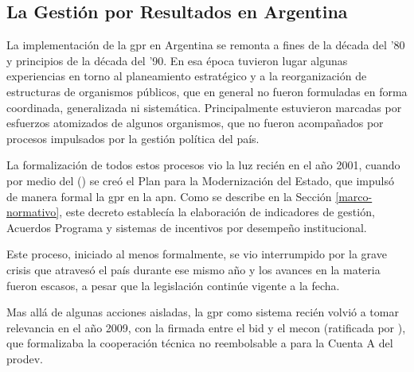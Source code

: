 \subsection{La Gestión por Resultados en Argentina}

La implementación de la \ac{gpr} en Argentina se remonta a fines de la década del '80 y principios de la década del '90. En esa época tuvieron lugar algunas experiencias en torno al planeamiento estratégico y a la reorganización de estructuras de organismos públicos, que en general no fueron formuladas en forma coordinada, generalizada ni sistemática. Principalmente estuvieron marcadas por esfuerzos atomizados de algunos organismos, que no fueron acompañados por procesos impulsados por la gestión política del país.

La formalización de todos estos procesos vio la luz recién en el año 2001, cuando por medio del \citeauthor{decreto103} (\citeyear{decreto103}) se creó el Plan para la Modernización del Estado, que impulsó de manera formal la \ac{gpr} en la \ac{apn}.
Como se describe en la Sección \ref{marco-normativo}, este decreto establecía la elaboración de indicadores de gestión, Acuerdos Programa y sistemas de incentivos por desempeño institucional.

Este proceso, iniciado al menos formalmente, se vio interrumpido por la grave crisis que atravesó el país durante ese mismo año y los avances en la materia fueron escasos, a pesar que la legislación continúe vigente a la fecha.

Mas allá de algunas acciones aisladas, la \ac{gpr} como sistema recién volvió a tomar relevancia en el año 2009,  con la \textcite{cartaprodev} firmada entre el \ac{bid} y el \ac{mecon} (ratificada por \textcite{decreto1673}), que formalizaba la cooperación técnica no reembolsable a para la Cuenta A del \ac{prodev}.


